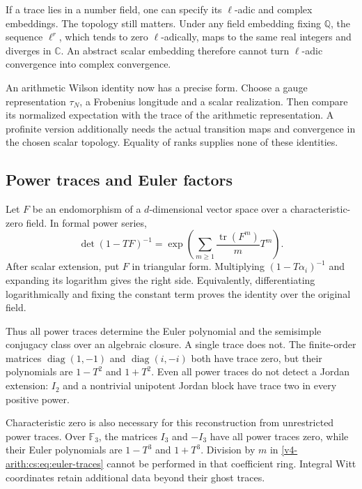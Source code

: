If a trace lies in a number field, one can specify its \(\ell\)-adic and
complex embeddings. The topology still matters. Under any field embedding
fixing \(\mathbb Q\), the sequence \(\ell^r\), which tends to zero
\(\ell\)-adically, maps to the same real integers and diverges in \(\mathbb
C\). An abstract scalar embedding therefore cannot turn \(\ell\)-adic
convergence into complex convergence.

An arithmetic Wilson identity now has a precise form. Choose a gauge
representation \(\tau_N\), a Frobenius longitude and a scalar realization.
Then compare its normalized expectation with the trace of the arithmetic
representation. A profinite version additionally needs the actual transition
maps and convergence in the chosen scalar topology. Equality of ranks
supplies none of these identities.

\subsection{Power traces and Euler factors}

Let \(F\) be an endomorphism of a \(d\)-dimensional vector space over a
characteristic-zero field. In formal power series,
\begin{equation}
 \det(1-TF)^{-1}
   =\exp\left(\sum_{m\ge1}\frac{\operatorname{tr}(F^m)}mT^m\right).
 \label{v4-arith:cs:eq:euler-traces}
\end{equation}
After scalar extension, put \(F\) in triangular form. Multiplying
\((1-T\alpha_i)^{-1}\) and expanding its logarithm gives the right side.
Equivalently, differentiating logarithmically and fixing the constant term
proves the identity over the original field.

Thus all power traces determine the Euler polynomial and the semisimple
conjugacy class over an algebraic closure. A single trace does not. The
finite-order matrices \(\operatorname{diag}(1,-1)\) and
\(\operatorname{diag}(i,-i)\) both have trace zero, but their polynomials
are \(1-T^2\) and \(1+T^2\). Even all power traces do not detect a Jordan
extension: \(I_2\) and a nontrivial unipotent Jordan block have trace two in
every positive power.

Characteristic zero is also necessary for this reconstruction from
unrestricted power traces. Over \(\mathbb F_3\), the matrices \(I_3\) and
\(-I_3\) have all power traces zero, while their Euler polynomials are
\(1-T^3\) and \(1+T^3\). Division by \(m\) in
\eqref{v4-arith:cs:eq:euler-traces} cannot be performed in that coefficient
ring. Integral Witt coordinates retain additional data beyond their ghost
traces.

